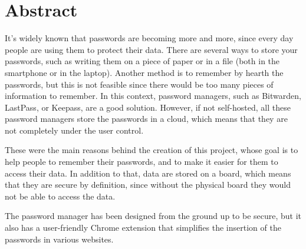 \chapter*{Abstract}

It's widely known that passwords are becoming more and more, since every day people are using them to protect their data. There are several ways to store your passwords, such as writing them on a piece of paper or in a file (both in the smartphone or in the laptop). Another method is to remember by hearth the passwords, but this is not feasible since there would be too many pieces of information to remember. In this context, password managers, such as Bitwarden, LastPass, or Keepass, are a good solution. However, if not self-hosted, all these password managers store the passwords in a cloud, which means that they are not completely under the user control. 

These were the main reasons behind the creation of this project, whose goal is to help people to remember their passwords, and to make it easier for them to access their data. In addition to that, data are stored on a board, which means that they are secure by definition, since without the physical board they would not be able to access the data. 

The password manager has been designed from the ground up to be secure, but it also has a user-friendly Chrome extension that simplifies the insertion of the passwords in various websites.